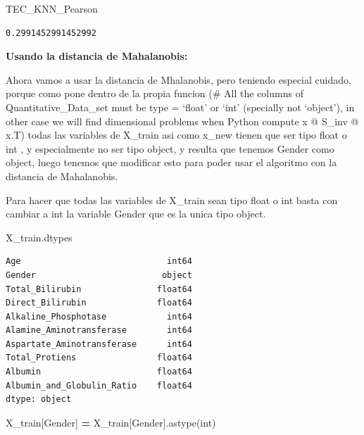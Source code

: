 \documentclass[
  11pt,
  a4paper,
]{article}
\newenvironment{Shaded}{\begin{snugshade}}{\end{snugshade}}
\newcommand{\NormalTok}[1]{#1}
\newcommand{\OperatorTok}[1]{\textcolor[rgb]{0.81,0.36,0.00}{\textbf{#1}}}
\newcommand{\StringTok}[1]{\textcolor[rgb]{0.31,0.60,0.02}{#1}}
\begin{document}
\begin{Shaded}
\begin{Highlighting}[]
\NormalTok{TEC\_KNN\_Pearson}
\end{Highlighting}
\end{Shaded}

\begin{verbatim}
0.2991452991452992
\end{verbatim}

\vspace{0.35cm}

\textbf{Usando la distancia de Mahalanobis:}

Ahora vamos a usar la distancia de Mhalanobis, pero teniendo especial
cuidado, porque como pone dentro de la propia funcion (\# All the
columns of Quantitative\_Data\_set must be type = `float' or `int'
(specially not `object'), in other case we will find dimensional
problems when Python compute x @ S\_inv @ x.T) todas las variables de
X\_train asi como x\_new tienen que ser tipo float o int , y
especialmente no ser tipo object, y resulta que tenemos Gender como
object, luego tenemos que modificar esto para poder usar el algoritmo
con la distancia de Mahalanobis.

Para hacer que todas las variables de X\_train sean tipo float o int
basta con cambiar a int la variable Gender que es la unica tipo object.

\begin{Shaded}
\begin{Highlighting}[]
\NormalTok{X\_train.dtypes}
\end{Highlighting}
\end{Shaded}

\begin{verbatim}
Age                             int64
Gender                         object
Total_Bilirubin               float64
Direct_Bilirubin              float64
Alkaline_Phosphotase            int64
Alamine_Aminotransferase        int64
Aspartate_Aminotransferase      int64
Total_Protiens                float64
Albumin                       float64
Albumin_and_Globulin_Ratio    float64
dtype: object
\end{verbatim}

\begin{Shaded}
\begin{Highlighting}[]
\NormalTok{X\_train[}\StringTok{\textquotesingle{}Gender\textquotesingle{}}\NormalTok{] }\OperatorTok{=}\NormalTok{ X\_train[}\StringTok{\textquotesingle{}Gender\textquotesingle{}}\NormalTok{].astype(}\StringTok{\textquotesingle{}int\textquotesingle{}}\NormalTok{)}
\end{Highlighting}
\end{Shaded}
\end{document}
